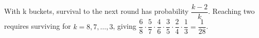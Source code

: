 With k buckets, survival to the next round has probability $\dfrac{k-2}{k}$. Reaching two requires surviving for $k=8,7,\ldots,3$, giving $\dfrac{6}{8}\cdot\dfrac{5}{7}\cdot\dfrac{4}{6}\cdot\dfrac{3}{5}\cdot\dfrac{2}{4}\cdot\dfrac{1}{3}=\boxed{\dfrac{1}{28}}$.
